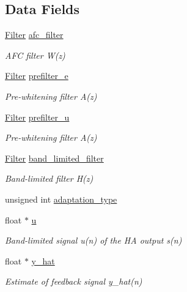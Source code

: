 \subsection*{Data Fields}
\begin{DoxyCompactItemize}
\item 
\mbox{\hyperlink{filter_8h_a69e34b8aa259d2ca0b81b5c95f395bdf}{Filter}} \mbox{\hyperlink{structafc__t_a33db3fc1bf008116481e632f6080972c}{afc\+\_\+filter}}
\begin{DoxyCompactList}\small\item\em A\+FC filter W(z) \end{DoxyCompactList}\item 
\mbox{\hyperlink{filter_8h_a69e34b8aa259d2ca0b81b5c95f395bdf}{Filter}} \mbox{\hyperlink{structafc__t_a67b0483fc918fc9af5cb64c6b79e41cf}{prefilter\+\_\+e}}
\begin{DoxyCompactList}\small\item\em Pre-\/whitening filter A(z) \end{DoxyCompactList}\item 
\mbox{\hyperlink{filter_8h_a69e34b8aa259d2ca0b81b5c95f395bdf}{Filter}} \mbox{\hyperlink{structafc__t_a43d15e690ac1c74461c8b8a5522d8e52}{prefilter\+\_\+u}}
\begin{DoxyCompactList}\small\item\em Pre-\/whitening filter A(z) \end{DoxyCompactList}\item 
\mbox{\hyperlink{filter_8h_a69e34b8aa259d2ca0b81b5c95f395bdf}{Filter}} \mbox{\hyperlink{structafc__t_ad649e5413644e0dd06b2dfe789dd0630}{band\+\_\+limited\+\_\+filter}}
\begin{DoxyCompactList}\small\item\em Band-\/limited filter H(z) \end{DoxyCompactList}\item 
unsigned int \mbox{\hyperlink{structafc__t_ad09604e56d2183c494456350cbb709ea}{adaptation\+\_\+type}}
\item 
float $\ast$ \mbox{\hyperlink{structafc__t_aa69482203264d41b13f96cda153faec3}{u}}
\begin{DoxyCompactList}\small\item\em Band-\/limited signal u(n) of the HA output s(n) \end{DoxyCompactList}\item 
float $\ast$ \mbox{\hyperlink{structafc__t_a7c5db3530c08c1bec07d6f4bf921537d}{y\+\_\+hat}}
\begin{DoxyCompactList}\small\item\em Estimate of feedback signal y\+\_\+hat(n) \end{DoxyCompactList}\item 

\end{DoxyCompactItemize}
